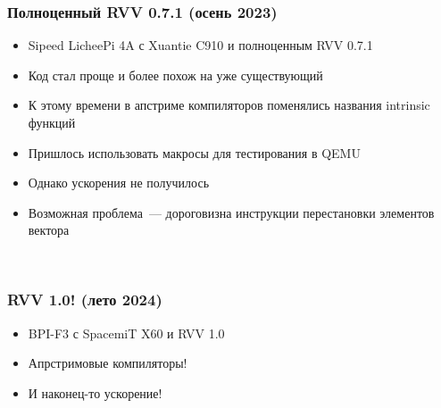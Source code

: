 \documentclass[aspectratio=169, handout]{beamer}
\begin{document}
\begin{frame}
    \frametitle{Полноценный RVV 0.7.1 (осень 2023)}

    \begin{itemize}[<+->]
        \item Sipeed LicheePi 4A с Xuantie C910 и полноценным RVV 0.7.1
        \item Код стал проще и более похож на уже существующий
        \item К этому времени в апстриме компиляторов поменялись названия intrinsic функций
        \item Пришлось использовать макросы для тестирования в QEMU
        \item Однако ускорения не получилось
        \item Возможная проблема~--- дороговизна инструкции перестановки элементов вектора
    \end{itemize}

    \ %


\end{frame}

\begin{frame}
    \frametitle{RVV 1.0! (лето 2024)}

    \begin{itemize}[<+->]
        \item BPI-F3 с SpacemiT X60 и RVV 1.0
        \item Апрстримовые компиляторы!
        \item И наконец-то ускорение!
    \end{itemize}




    \ %

\end{frame}
\end{document}
